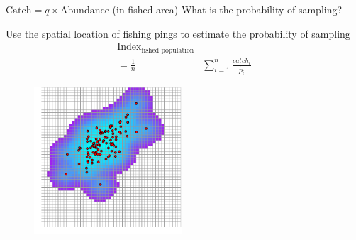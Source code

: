 \documentclass{beamer}
\begin{document}
\begin{frame}{$\text{Catch} = q \times \text{Abundance}$ (in \alert{fished} area)}
What is the probability of sampling?\\
\begin{minipage}{0.4\textwidth}
  \begin{flushright}
    Use the spatial location of fishing pings to estimate the probability of sampling\\
    \begin{align*}
      \text{Index}_\text{fished population} & \\
       = \frac{1}{n} &\sum_{i=1}^n \frac{catch_i}{\hat{p}_i}  
    \end{align*}  
  \end{flushright}
\end{minipage}
\hspace{0.5cm}
\begin{minipage}{0.4\textwidth}
  \begin{figure}
    \centering
    \includegraphics[width=5.5cm]{fig5}
  \end{figure}
\end{minipage}
\end{frame}
\end{document}
